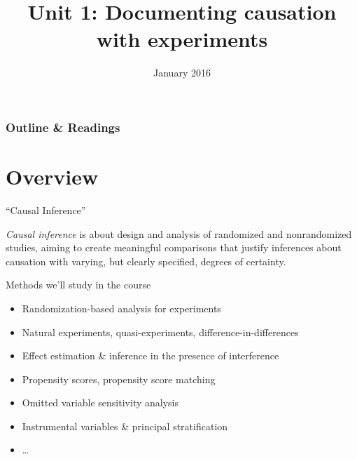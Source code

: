 %

%






\title{Unit 1: Documenting causation with experiments}
\date{January 2016}




  \begin{frame}
    \frametitle{Outline \& Readings}

\tableofcontents[subsectionstyle=show/hide/hide]

\end{frame}

\itnote{
\item 
}

\section{Overview}

\begin{frame}{``Causal Inference''}

 \textit{Causal inference} is about design and analysis of randomized and nonrandomized studies, aiming to create meaningful comparisons that justify inferences about causation with varying, but clearly specified, degrees of certainty.  
\pause

\end{frame}

\begin{frame}[label=whatWeWillCoverFr]{Methods we'll study in the course}
  \begin{itemize}
  \item Randomization-based analysis for experiments
  \item Natural experiments, quasi-experiments,
    difference-in-differences
  \item Effect estimation \& inference in the presence of interference 
  \item Propensity scores, propensity score matching
  \item Omitted variable sensitivity analysis
  \item Instrumental variables \& principal stratification
  \item \ldots
  \end{itemize}
\end{frame}


